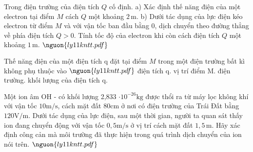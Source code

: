 \begin{ex}
Trong điện trường của điện tích $Q$ cố định. a) Xác định thế năng điện của một electron tại điểm $M$ cách $Q$ một khoảng $2\,\text{m}$. b) Dưới tác dụng của lực điện kéo electron từ điểm $M$ và với vận tốc ban đầu bằng 0, dịch chuyển theo đường thẳng về phía điện tích $Q \gt  0$. Tính tốc độ của electron khi còn cách điện tích $Q$ một khoảng $1\,\text{m}$. $\nguon{ly11 kntt.pdf}$
\choiceTF

\end{ex}

\begin{ex}
Thế năng điện của một điện tích q đặt tại điểm $M$ trong một điện trường bất kì không phụ thuộc vào $\nguon{ly11 kntt.pdf}$
\choice
{điện tích q.}
{vị trí điểm M.}
{điện trường.}
{\True khối lượng của điện tích q.}
\end{ex}

\begin{ex}
Một ion âm OH - có khối lượng 2,833 $\cdot10^{-26}\mathrm{kg}$ được thổi ra từ máy lọc không khí với vận tốc $10 \mathrm{m/s}$, cách mặt đất $80 \mathrm{cm}$ ở nơi có điện trường của Trái Đất bằng $120 \mathrm{V/m}$. Dưới tác dụng của lực điện, sau một thời gian, người ta quan sát thấy ion đang chuyển động với vận tốc $0,5 \mathrm{m/s}$ ở vị trí cách mặt đất $1,5\,\text{m}$. Hãy xác định công cản mà môi trường đã thực hiện trong quá trình dịch chuyển của ion nói trên. $\nguon{ly11 kntt.pdf}$
\choiceTF

\end{ex}

